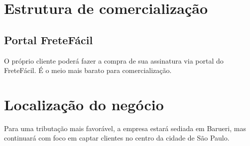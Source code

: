 \section{Estrutura de comercialização}
\subsection{Portal FreteFácil}
O próprio cliente poderá fazer a compra de sua assinatura via portal do FreteFácil. É o meio mais barato para comercialização.

\section{Localização do negócio}
Para uma tributação mais favorável, a empresa estará sediada em Barueri, mas continuará com foco em captar clientes no centro da cidade de São Paulo.